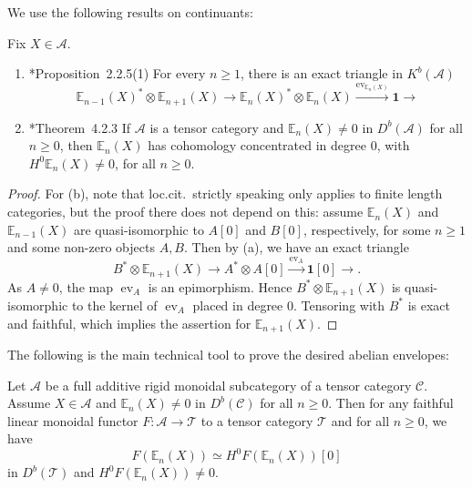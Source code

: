\documentclass[11pt,oneside]{amsart}
\theoremstyle{definition}
\theoremstyle{remark}
\newcommand\EE{\mathbb E}
\newcommand\cA{\mathcal A}
\newcommand\cC{\mathcal C}
\newcommand\cT{\mathcal T}
\newcommand\ev{\operatorname{ev}}
\renewcommand\o\otimes
\renewcommand\:\colon
\newcommand\one{\mathbf 1}
\begin{document}
We use the following results on continuants:

\begin{proposition} \label{prop:EC} Fix $X\in\cA$.
\begin{enumerate}
\renewcommand{\theenumi}{\alph{enumi}}
\item \cite{CE}*{Proposition~2.2.5(1)} For every $n\ge1$, there is an exact triangle in $K^b(\cA)$
$$
\EE_{n-1}(X)^* \o \EE_{n+1}(X) \to \EE_n(X)^*\o \EE_n(X) \xrightarrow{\ev_{\EE_n(X)}} \one \to
$$
\item \cite{CE}*{Theorem~4.2.3} If $\cA$ is a tensor category and $\EE_n(X)\neq0$ in $D^b(\cA)$ for all $n\ge0$, then $\EE_n(X)$ has cohomology concentrated in degree $0$, with $H^0\EE_n(X)\neq0$, for all $n\ge0$.
\end{enumerate}
\end{proposition}

\begin{proof} For (b), note that loc.cit.~strictly speaking only applies to finite length categories, but the proof there does not depend on this: assume $\EE_n(X)$ and $\EE_{n-1}(X)$ are quasi-isomorphic to $A[0]$ and $B[0]$, respectively, for some $n\ge1$ and some non-zero objects $A,B$. Then by (a), we have an exact triangle
$$
B^* \o \EE_{n+1}(X) \to A^*\o A[0] \xrightarrow{\ev_A} \one[0] \to .
$$
As $A\neq0$, the map $\ev_A$ is an epimorphism. Hence $B^*\o \EE_{n+1}(X)$ is quasi-isomorphic to the kernel of $\ev_A$ placed in degree $0$. Tensoring with $B^*$ is exact and faithful, which implies the assertion for $\EE_{n+1}(X)$.
\end{proof}

\medskip

The following is the main technical tool to prove the desired abelian envelopes:

\begin{proposition} \label{prop:concentrated}
Let $\cA$ be a full additive rigid monoidal subcategory of a tensor category $\cC$.
Assume $X\in\cA$ and $\EE_n(X)\neq0$ in $D^b(\cC)$ for all $n\ge0$.
Then for any faithful linear monoidal functor $F\:\cA\to\cT$ to a tensor category $\cT$ and for all $n \geq 0$, we have
$$
F(\EE_n(X)) \simeq H^0 F(\EE_n(X))[0]
$$
in $D^b(\cT)$ and $H^0 F(\EE_n(X)) \neq 0$.
\end{proposition}
\end{document}
